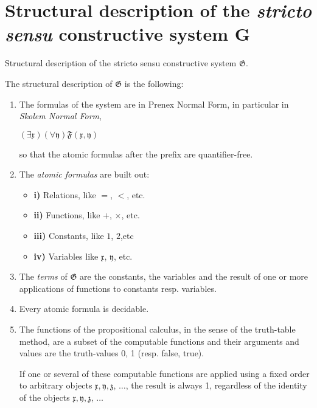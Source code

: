 \documentclass[12pt]{article}
\begin{document}
\section{Structural description of the \emph{stricto sensu} constructive system G}\normalsize

Structural description of the stricto sensu constructive system $\mathfrak{G}$.

The structural description of $\mathfrak{G}$ is the following:

\begin{enumerate}

\item The formulas of the system are in Prenex Normal Form, in particular in \emph{Skolem Normal Form},

\begin{center}
$(\exists \mathfrak{x}) (\forall \mathfrak{y}) \mathfrak{F} (\mathfrak{x}, \mathfrak{y})$
\end{center}

so that the atomic formulas after the prefix are quantifier-free.

\item The \emph{atomic formulas} are built out:

\begin{itemize}
\item \textbf{i)} Relations, like $=$, $<$, etc.
\item \textbf{ii)} Functions, like $+$, $\times$, etc.
\item \textbf{iii)} Constants, like $1$, $2$,etc
\item \textbf{iv)} Variables like $\mathfrak{x}$, $\mathfrak{y}$, etc.
\end{itemize}

\item The \emph{terms} of $\mathfrak{G}$ are the constants, the variables and the result of one or more applications of functions to constants resp. variables.

\item Every atomic formula is decidable.

\item The functions of the propositional calculus, in the sense of the truth-table method, are a subset of the computable functions and their arguments and values are the truth-values 0, 1 (resp. false, true).

If one or several of these computable functions are applied using a fixed order to arbitrary objects $\mathfrak{x, y, z}$, $\ldots$, the result is always 1, regardless of the identity of the objects $\mathfrak{x, y, z}$, $\ldots$ 


\end{enumerate}
\end{document}
